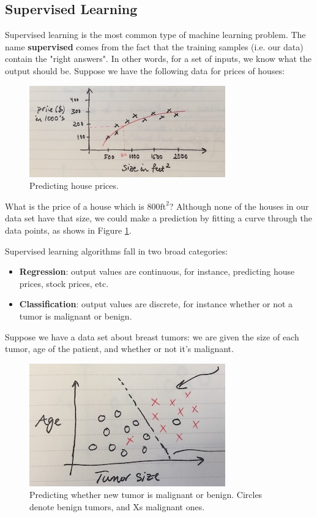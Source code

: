 \documentclass{article}
\theoremstyle{definition}
\begin{document}
\subsection{Supervised Learning}
Supervised learning is the most common type of machine learning problem. The name \textbf{supervised} comes from the fact that the training samples (i.e. our data) contain the "right answers". In other words, for a set of inputs, we know what the output should be. Suppose we have the following data for prices of houses:

\begin{figure}[ht]
\centering
\includegraphics[scale=0.8]{images/intro/house-prices.jpg}
\caption{Predicting house prices.}
\label{into-house-prices}
\end{figure}

What is the price of a house which is $800 \text{ft}^2$? Although none of the houses in our data set have that size, we could make a prediction by fitting a curve through the data points, as shows in Figure \ref{into-house-prices}.

Supervised learning algorithms fall in two broad categories:
\begin{itemize}
    \item \textbf{Regression}: output values are continuous, for instance, predicting house prices, stock prices, etc.
    \item \textbf{Classification}: output values are discrete, for instance whether or not a tumor is malignant or benign.
\end{itemize}

Suppose we have a data set about breast tumors: we are given the size of each tumor, age of the patient, and whether or not it's malignant.

\begin{figure}[ht]
\centering
\includegraphics[scale=0.8]{images/intro/tumor.jpg}
\caption{Predicting whether new tumor is malignant or benign. Circles denote benign tumors, and Xs malignant ones.}
\label{intro-tumor}
\end{figure}
\end{document}
